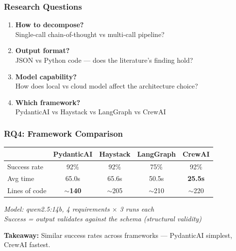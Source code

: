 \begin{frame}
  \frametitle{Research Questions}

  \begin{enumerate}
    \item[\textbf{RQ1}] \textbf{How to decompose?}\\
    Single-call chain-of-thought vs multi-call pipeline?

    \bigskip
    \item[\textbf{RQ2}] \textbf{Output format?}\\
    JSON vs Python code — does the literature's finding hold?

    \bigskip
    \item[\textbf{RQ3}] \textbf{Model capability?}\\
    How does local vs cloud model affect the architecture choice?

    \bigskip
    \item[\textbf{RQ4}] \textbf{Which framework?}\\
    PydanticAI vs Haystack vs LangGraph vs CrewAI
  \end{enumerate}
\end{frame}



\begin{frame}
  \frametitle{RQ4: Framework Comparison}
  \centering

  \small
  \renewcommand{\arraystretch}{1.4}
  \begin{tabular}{lcccc}
  \toprule
  & \textbf{PydanticAI} & \textbf{Haystack} & \textbf{LangGraph} & \textbf{CrewAI} \\
  \midrule
  Success rate & 92\% & 92\% & 75\% & 92\% \\
  Avg time & 65.0s & 65.6s & 50.5s & \textbf{25.5s} \\
  Lines of code & \textbf{$\sim$140} & $\sim$205 & $\sim$210 & $\sim$220 \\
  \bottomrule
  \end{tabular}

  \bigskip
  \small
  \textit{Model: qwen2.5:14b, 4 requirements $\times$ 3 runs each}\\
  \textit{Success = output validates against the schema (structural validity)}

  \bigskip
  \textbf{Takeaway:} Similar success rates across frameworks —
  PydanticAI simplest, CrewAI fastest.
\end{frame}


